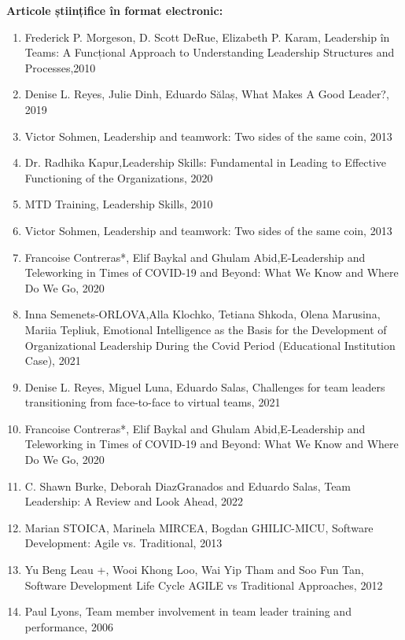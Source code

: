 \documentclass[a4paper, 12pt]{article}
\begin{document}
	\textbf{Articole științifice în format electronic:}
	\begin{enumerate}[1.]
		\item Frederick P. Morgeson, D. Scott DeRue, Elizabeth P. Karam, Leadership în Teams: A Funcțional Approach to Understanding Leadership Structures and Processes,2010
	\item Denise L. Reyes, Julie Dinh, Eduardo Sălaș, What Makes A Good Leader?, 2019
	\item Victor Sohmen, Leadership and teamwork: Two sides of the same coin, 2013
	\item Dr. Radhika Kapur,Leadership Skills: Fundamental in Leading to Effective Functioning of the Organizations, 2020
	\item MTD Training, Leadership Skills, 2010

	\item Victor Sohmen, Leadership and teamwork: Two sides of the same coin, 2013
	\item Francoise Contreras*, Elif Baykal and Ghulam Abid,E-Leadership and Teleworking in Times of COVID-19 and Beyond: What We Know and Where Do We Go, 2020
	\item Inna Semenets-ORLOVA,Alla Klochko, Tetiana Shkoda, Olena Marusina, Mariia Tepliuk, Emotional Intelligence as the Basis for the Development of Organizational Leadership During the Covid Period (Educational Institution Case), 2021
	\item Denise L. Reyes, Miguel Luna, Eduardo Salas, Challenges for team leaders transitioning from face-to-face to virtual teams, 2021

	\item Francoise Contreras*, Elif Baykal and Ghulam Abid,E-Leadership and Teleworking in Times of COVID-19 and Beyond: What We Know and Where Do We Go, 2020
	\item C. Shawn Burke, Deborah DiazGranados and Eduardo Salas, Team Leadership: A Review and Look Ahead, 2022
	\item Marian STOICA, Marinela MIRCEA, Bogdan GHILIC-MICU, Software Development: Agile vs. Traditional, 2013
	\item Yu Beng Leau +, Wooi Khong Loo, Wai Yip Tham and Soo Fun Tan, Software Development Life Cycle AGILE vs Traditional Approaches, 2012
	\item Paul Lyons, Team member involvement in team leader training and performance, 2006
	\end{enumerate}
\end{document}

